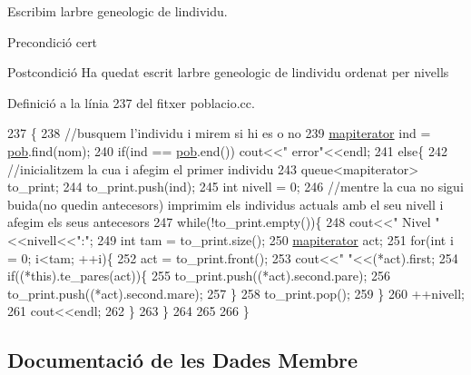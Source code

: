 Escribim l\textquotesingle{}arbre geneologic de l\textquotesingle{}individu. 

\begin{DoxyPrecond}{Precondició}
cert 
\end{DoxyPrecond}
\begin{DoxyPostcond}{Postcondició}
Ha quedat escrit l\textquotesingle{}arbre geneologic de l\textquotesingle{}individu ordenat per nivells 
\end{DoxyPostcond}


Definició a la línia 237 del fitxer poblacio.\+cc.


\begin{DoxyCode}
237                                                   \{
238   \textcolor{comment}{//busquem l'individu i mirem si hi es o no}
239   \hyperlink{classpoblacio_a52c3d96b08f7679f27487e7499185ed1}{mapiterator} ind = \hyperlink{classpoblacio_a7ecb70033b151a937143b07d489c4c17}{pob}.find(nom);
240   \textcolor{keywordflow}{if}(ind == \hyperlink{classpoblacio_a7ecb70033b151a937143b07d489c4c17}{pob}.end()) cout<<\textcolor{stringliteral}{"  error"}<<endl;
241   \textcolor{keywordflow}{else}\{
242     \textcolor{comment}{//inicialitzem la cua i afegim el primer individu}
243   queue<mapiterator> to\_print;
244   to\_print.push(ind);
245   \textcolor{keywordtype}{int} nivell = 0;
246   \textcolor{comment}{//mentre la cua no sigui buida(no quedin antecesors) imprimim els individus actuals amb el seu nivell i
       afegim els seus antecesors}
247   \textcolor{keywordflow}{while}(!to\_print.empty())\{
248     cout<<\textcolor{stringliteral}{"  Nivel "}<<nivell<<\textcolor{stringliteral}{":"};
249     \textcolor{keywordtype}{int} tam  = to\_print.size();
250     \hyperlink{classpoblacio_a52c3d96b08f7679f27487e7499185ed1}{mapiterator} act;
251     \textcolor{keywordflow}{for}(\textcolor{keywordtype}{int} i = 0; i<tam; ++i)\{
252       act = to\_print.front();
253       cout<<\textcolor{stringliteral}{" "}<<(*act).first;
254       \textcolor{keywordflow}{if}((*this).te\_pares(act))\{
255         to\_print.push((*act).second.pare);
256         to\_print.push((*act).second.mare);
257       \}
258       to\_print.pop();
259     \}
260     ++nivell;
261     cout<<endl;
262   \}
263   \}
264 
265 
266 \}
\end{DoxyCode}


\subsection{Documentació de les Dades Membre}
